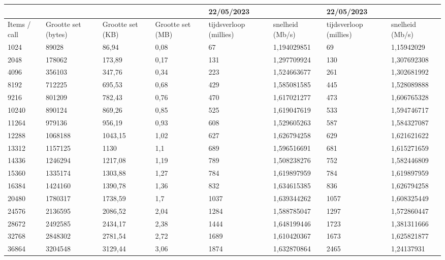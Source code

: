 \begin{table}
    \centering
    \begin{tabular}{llllllll}
        \toprule
        \textbf{} & \textbf{} & \textbf{} & \textbf{} & \textbf{22/05/2023} & \textbf{} & \textbf{22/05/2023} & \textbf{} \\
        \midrule
        Items / call & Grootte set (bytes) & Grootte set (KB) & Grootte set (MB) & tijdsverloop (millies) & snelheid (Mb/s) & tijdsverloop (millies) & snelheid (Mb/s) \\
        1024 & 89028 & 86,94 & 0,08 & 67 & 1,194029851 & 69 & 1,15942029 \\
        2048 & 178062 & 173,89 & 0,17 & 131 & 1,297709924 & 130 & 1,307692308 \\
        4096 & 356103 & 347,76 & 0,34 & 223 & 1,524663677 & 261 & 1,302681992 \\
        8192 & 712225 & 695,53 & 0,68 & 429 & 1,585081585 & 445 & 1,528089888 \\
        9216 & 801209 & 782,43 & 0,76 & 470 & 1,617021277 & 473 & 1,606765328 \\
        10240 & 890124 & 869,26 & 0,85 & 525 & 1,619047619 & 533 & 1,594746717 \\
        11264 & 979136 & 956,19 & 0,93 & 608 & 1,529605263 & 587 & 1,584327087 \\
        12288 & 1068188 & 1043,15 & 1,02 & 627 & 1,626794258 & 629 & 1,621621622 \\
        13312 & 1157125 & 1130 & 1,1 & 689 & 1,596516691 & 681 & 1,615271659 \\
        14336 & 1246294 & 1217,08 & 1,19 & 789 & 1,508238276 & 752 & 1,582446809 \\
        15360 & 1335174 & 1303,88 & 1,27 & 784 & 1,619897959 & 784 & 1,619897959 \\
        16384 & 1424160 & 1390,78 & 1,36 & 832 & 1,634615385 & 836 & 1,626794258 \\
        20480 & 1780317 & 1738,59 & 1,7 & 1037 & 1,639344262 & 1057 & 1,608325449 \\
        24576 & 2136595 & 2086,52 & 2,04 & 1284 & 1,588785047 & 1297 & 1,572860447 \\
        28672 & 2492585 & 2434,17 & 2,38 & 1444 & 1,648199446 & 1723 & 1,381311666 \\
        32768 & 2848302 & 2781,54 & 2,72 & 1689 & 1,610420367 & 1673 & 1,625821877 \\
        36864 & 3204548 & 3129,44 & 3,06 & 1874 & 1,632870864 & 2465 & 1,24137931 \\

\end{tabular}
\end{table}
